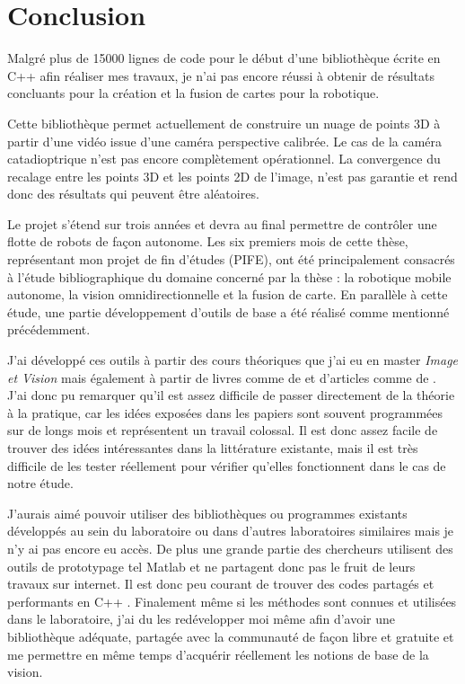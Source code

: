 \section{Conclusion}

Malgré plus de 15000 lignes de code pour le début d'une bibliothèque écrite en C++ afin réaliser mes travaux, je n'ai pas encore réussi à obtenir de résultats concluants pour la création et la fusion de cartes pour la robotique.

Cette bibliothèque permet actuellement de construire un nuage de points 3D à partir d'une vidéo issue d'une caméra perspective calibrée.
Le cas de la caméra catadioptrique n'est pas encore complètement opérationnel.
La convergence du recalage entre les points 3D et les points 2D de l'image, n'est pas garantie et rend donc des résultats qui peuvent être aléatoires.

Le projet s'étend sur trois années et devra au final permettre de contrôler une flotte de robots de façon autonome.
Les six premiers mois de cette thèse, représentant mon projet de fin d'études (PIFE), ont été principalement consacrés à l'étude bibliographique du domaine concerné par la thèse : la robotique mobile autonome, la vision omnidirectionnelle et la fusion de carte.
En parallèle à cette étude, une partie développement d'outils de base a été réalisé comme mentionné précédemment.

J'ai développé ces outils à partir des cours théoriques que j'ai eu en master \emph{Image et Vision} mais également à partir de livres comme 
 de \citeauthor{Hartley03Book} \cite{Hartley03Book} 
et d'articles comme  de \citeauthor{Puig08} \cite{Puig08}.
J'ai donc pu remarquer qu'il est assez difficile de passer directement de la théorie à la pratique, car les idées exposées dans les papiers sont souvent programmées sur de longs mois et représentent un travail colossal.
Il est donc assez facile de trouver des idées intéressantes dans la littérature existante, mais il est très difficile de les tester réellement pour vérifier qu'elles fonctionnent dans le cas de notre étude.

J'aurais aimé pouvoir utiliser des bibliothèques ou programmes existants développés au sein du laboratoire ou dans d'autres laboratoires similaires mais je n'y ai pas encore eu accès.
De plus une grande partie des chercheurs utilisent des outils de prototypage tel Matlab et ne partagent donc pas le fruit de leurs travaux sur internet.
Il est donc peu courant de trouver des codes partagés et performants en C++ .
Finalement même si les méthodes sont connues et utilisées dans le laboratoire, j'ai du les redévelopper moi même afin d'avoir une bibliothèque adéquate, partagée avec la communauté de façon libre et gratuite et me permettre en même temps d'acquérir réellement les notions de base de la vision.

